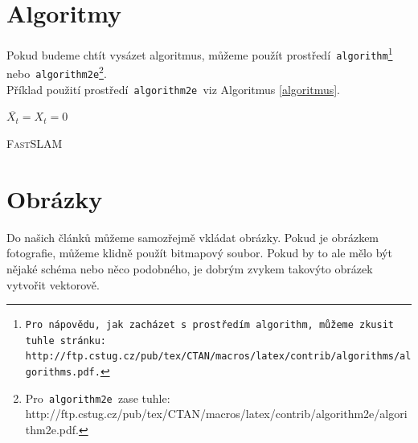 \documentclass[11pt,a4paper,oneside]{article}
\begin{document}
	\pagebreak

\newpage
	\section{Algoritmy}\label{sek3}
	
	Pokud budeme chtít vysázet algoritmus, můžeme použít prostředí\texttt{ algorithm\footnote{Pro\,nápovědu,\,jak\,zacházet\,s~prostředím\texttt{ algorithm, }můžeme\,zkusit\,tuhle\,stránku:\\ 			http://ftp.cstug.cz/pub/tex/CTAN/macros/latex/contrib/algorithms/algorithms.pdf.} } nebo\texttt{ algorithm2e}\footnote{Pro\texttt{ algorithm2e }zase tuhle: 											http://ftp.cstug.cz/pub/tex/CTAN/macros/latex/contrib/algorithm2e/algorithm2e.pdf.}.\\
	Příklad použití prostředí\texttt{ algorithm2e }viz Algoritmus \ref{algoritmus}.
	
\begin{algorithm}
  \SetAlgoNoLine
  \SetNlSkip{-1.20em}
  \SetNlSty{}{}{:}
\Indp
  \BlankLine
  $\overline{X_t} = X_t = 0$ \BlankLine   
        
\caption{\textsc{Fast}SLAM\label{algoritmus}}
\end{algorithm}
	
	\section{Obrázky}
	
	Do našich článků můžeme samozřejmě vkládat obrázky. Pokud je obrázkem fotografie, můžeme klidně použít bitmapový soubor. Pokud by to ale mělo být nějaké schéma nebo něco podobného, je dobrým zvykem takovýto obrázek vytvořit vektorově.	
	
\end{document}
